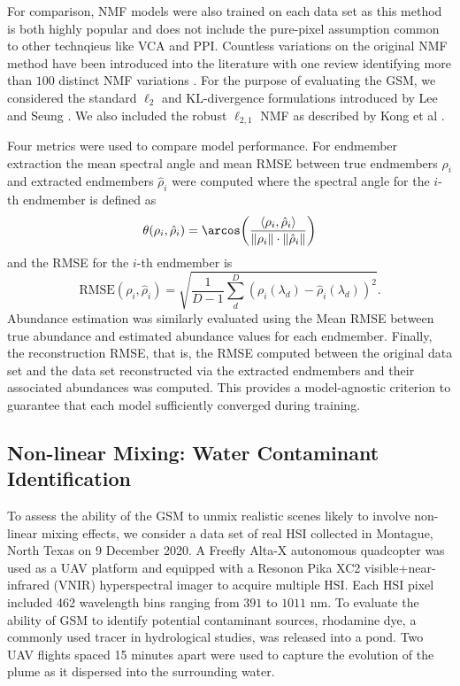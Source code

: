 \documentclass[remotesensing,article,submit,pdftex,moreauthors]{Definitions/mdpi}
\begin{document}
For comparison, NMF models were also trained on each data set as this method is both highly popular and does not include the pure-pixel assumption common to other technqieus like VCA and PPI. Countless variations on the original NMF method have been introduced into the literature with one review identifying more than $100$ distinct NMF variations \cite{unmixing-nmf-review}. For the purpose of evaluating the GSM, we considered the standard $\ell_2$ and KL-divergence formulations introduced by Lee and Seung \cite{nmf-algorithms}. We also included the robust $\ell_{2,1}$ NMF as described by Kong et al \cite{nmf-l21}.

Four metrics were used to compare model performance. For endmember extraction the mean spectral angle and mean RMSE between true endmembers $\rho_i$ and extracted endmembers $\hat{\rho}_i$ were computed where the spectral angle for the $i$-th endmember is defined as 
\begin{equation}
    \theta(\rho_i, \hat{\rho}_i) =  \arcos\left( \dfrac{\langle \rho_i, \hat{\rho}_i \rangle}{\lVert \rho_i \rVert \cdot \lVert \hat{\rho}_i \rVert}\right)
\end{equation}
and the RMSE for the $i$-th endmember is
\begin{equation}
    \text{RMSE}(\rho_i, \hat{\rho}_i) = \sqrt{\frac{1}{D-1}\sum_d^D\left(\rho_i(\lambda_d) - \hat{\rho}_i(\lambda_d) \right)^2}.
\end{equation}
Abundance estimation was similarly evaluated using the Mean RMSE between true abundance and estimated abundance values for each endmember. Finally, the reconstruction RMSE, that is, the RMSE computed between the original data set and the data set reconstructed via the extracted endmembers and their associated abundances was computed. This provides a model-agnostic criterion to guarantee that each model sufficiently converged during training.

\subsection{Non-linear Mixing: Water Contaminant Identification}

To assess the ability of the GSM to unmix realistic scenes likely to involve non-linear mixing effects, we consider a data set of real HSI collected in Montague, North Texas on 9 December 2020. A Freefly Alta-X autonomous quadcopter was used as a UAV platform and equipped with a Resonon Pika XC2 visible+near-infrared (VNIR) hyperspectral imager to acquire multiple HSI. Each HSI pixel included 462 wavelength bins ranging from $391$ to $1011$ nm. To evaluate the ability of GSM to identify potential contaminant sources, rhodamine dye, a commonly used tracer in hydrological studies, was released into a pond. Two UAV flights spaced 15 minutes apart were used to capture the evolution of the plume as it dispersed into the surrounding water.
\end{document}

